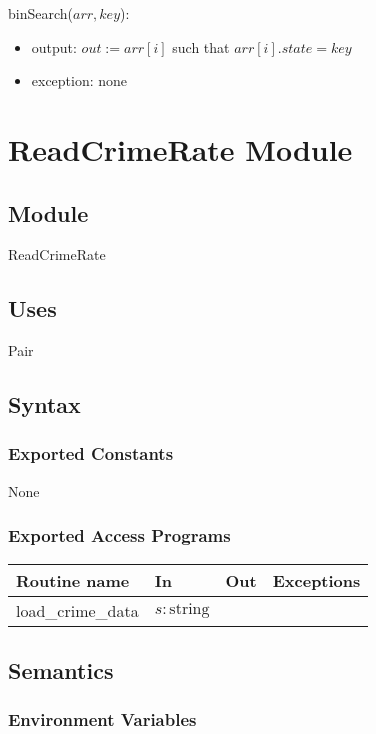 \documentclass[12pt]{article}
\begin{document}
\noindent
binSearch($arr, key$):
\begin{itemize}
\item output: $\mathit{out} := arr[i]$ such that $arr[i].state = key$
\item exception: none
\end{itemize}

\newpage


\section* {ReadCrimeRate Module}

\subsection* {Module}

ReadCrimeRate

\subsection* {Uses}

Pair

\subsection* {Syntax}

\subsubsection* {Exported Constants}

None

\subsubsection* {Exported Access Programs}

\begin{tabular}{| l | l | l | l |}
\hline
\textbf{Routine name} & \textbf{In} & \textbf{Out} & \textbf{Exceptions}\\
\hline
load\_crime\_data & $s: \mbox{string}$ & ~ & ~\\
\hline
\end{tabular}

\subsection* {Semantics}

\subsubsection* {Environment Variables}
\end{document}
